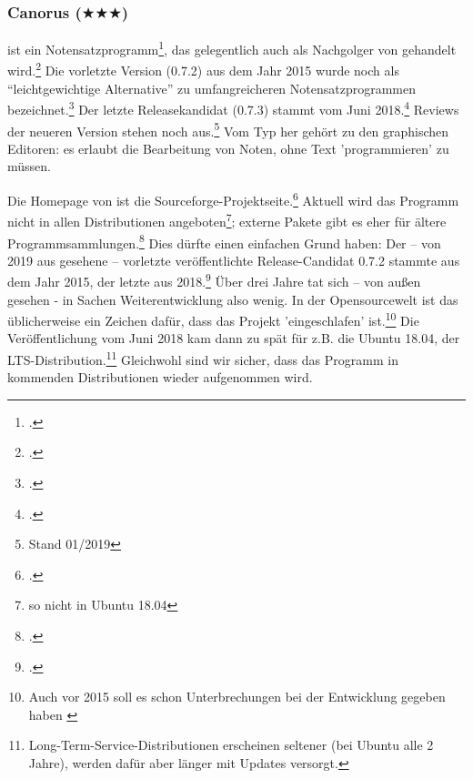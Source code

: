 %
%
%



\subsubsection{Canorus ($\bigstar\bigstar\bigstar$)}

\label{Canorus} ist ein Notensatzprogramm\footcite[vgl.][\nopage
wp]{Canorus2019a}, das gelegentlich auch als Nachgolger von 
gehandelt wird.\footcite[vgl.][\nopage wp]{WpedCanorus2019a} Die vorletzte
Version (0.7.2) aus dem Jahr 2015 wurde noch als \enquote{leichtgewichtige
Alternative} zu umfangreicheren Notensatzprogrammen
bezeichnet.\footcite[vgl.][\nopage wp]{Kreussel2015a} Der letzte Releasekandidat
(0.7.3) stammt vom Juni 2018.\footcite[vgl.][\nopage wp]{Canorus2019b} Reviews
der neueren Version stehen noch aus.\footnote{Stand 01/2019} Vom Typ her gehört
 zu den graphischen Editoren: es erlaubt die Bearbeitung von Noten,
ohne Text 'programmieren' zu müssen.

Die Homepage von  ist die
Sourceforge-Projektseite.\footcite[vgl.][\nopage wp]{Canorus2019a} Aktuell wird
das Programm nicht in allen Distributionen angeboten\footnote{so nicht in Ubuntu
18.04}; externe Pakete gibt es eher für ältere
Programmsammlungen.\footcite[vgl.][\nopage wp]{RepoCanorus2019a} Dies dürfte
einen einfachen Grund haben: Der -- von 2019 aus gesehene -- vorletzte
veröffentlichte Release-Candidat 0.7.2 stammte aus dem Jahr 2015, der letzte aus
2018.\footcite[vgl.][\nopage wp]{Canorus2019b} Über drei Jahre tat sich -- von
außen gesehen - in Sachen Weiterentwicklung also wenig. In der Opensourcewelt
ist das üblicherweise ein Zeichen dafür, dass das Projekt 'eingeschlafen'
ist.\footnote{Auch vor 2015 soll es schon Unterbrechungen bei der Entwicklung
gegeben haben \cite[vgl.][\nopage wp]{UbuntuCanorus2014a}} Die Veröffentlichung
vom Juni 2018 kam dann zu spät für z.B. die Ubuntu 18.04, der
LTS-Distribution.\footnote{Long-Term-Service-Distributionen erscheinen seltener
(bei Ubuntu alle 2 Jahre), werden dafür aber länger mit Updates versorgt.}
Gleichwohl sind wir sicher, dass das Programm in kommenden Distributionen wieder
aufgenommen wird.

